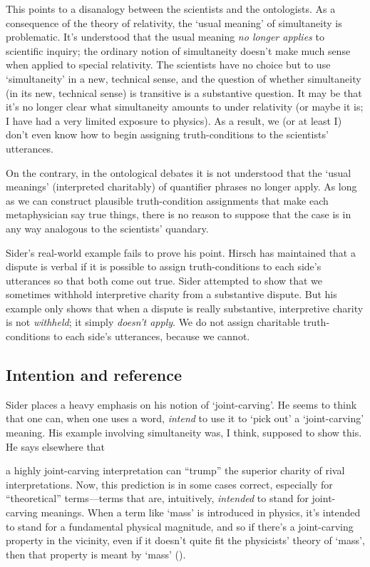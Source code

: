 \documentclass[11pt]{article}
\newenvironment{squote}{%
\begin{spacing}{1}
       	\begin{list}{}{%
\setlength{\labelwidth}{0pt}%
\rightmargin\leftmargin%
}
\item\relax
}{%
\end{list}%
\end{spacing}
}
\begin{document}
\begin{spacing}{1.25}
This points to a disanalogy between the scientists and the
ontologists.  As a consequence of the theory of relativity, the `usual
meaning' of simultaneity is problematic.  It's understood that the
usual meaning {\em no longer applies} to scientific inquiry; the
ordinary notion of simultaneity doesn't make much sense when applied
to special relativity.  The scientists have no choice but to use
`simultaneity' in a new, technical sense, and the question of whether
simultaneity (in its new, technical sense) is transitive is a
substantive question.  It may be that it's no longer clear what
simultaneity amounts to under relativity (or maybe it is; I have had a
very limited exposure to physics).  As a result, we (or at least I)
don't even know how to begin assigning truth-conditions to the
scientists' utterances.

On the contrary, in the ontological debates it is not understood that
the `usual meanings' (interpreted charitably) of quantifier phrases no
longer apply.  As long as we can construct plausible truth-condition
assignments that make each metaphysician say true things, there is no
reason to suppose that the case is in any way analogous to the
scientists' quandary.

Sider's real-world example fails to prove his point.  Hirsch has
maintained that a dispute is verbal if it is possible to assign
truth-conditions to each side's utterances so that both come out true.
Sider attempted to show that we sometimes withhold interpretive
charity from a substantive dispute.  But his example only shows that
when a dispute is really substantive, interpretive charity is not {\em
  withheld}; it simply {\em doesn't apply}.  We do not assign
charitable truth-conditions to each side's utterances, because we
cannot.

\subsection{Intention and reference}
Sider places a heavy emphasis on his notion of `joint-carving'.  He
seems to think that one can, when one uses a word, {\em intend} to use
it to `pick out' a `joint-carving' meaning.  His example involving
simultaneity was, I think, supposed to show this.  He says elsewhere
that

\begin{squote}
a highly joint-carving interpretation can ``trump'' the superior
charity of rival interpretations.  Now, this prediction is in some
cases correct, especially for ``theoretical'' terms---terms that are,
intuitively, {\em intended} to stand for joint-carving meanings.  When
a term like `mass' is introduced in physics, it's intended to stand
for a fundamental physical magnitude, and so if there's a
joint-carving property in the vicinity, even if it doesn't quite fit
the physicists' theory of `mass', then that property is meant by
`mass' (\citeyear[31]{sider2011a}).
\end{squote}


\end{spacing}
\end{document}

